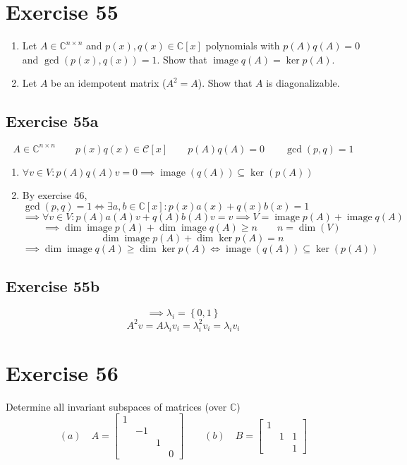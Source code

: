 \documentclass[a4paper]{article}
\theoremstyle{definition}
\DeclareMathOperator\image{image}
\newcommand\set[1]{\left\{#1\right\}}
\begin{document}
\section{Exercise 55}
\begin{ex}
  \begin{enumerate}
    \item Let $A \in \mathbb C^{n \times n}$ and $p(x), q(x) \in \mathbb C[x]$ polynomials with $p(A) q(A) = 0$ and $\operatorname{gcd}(p(x), q(x)) = 1$. Show that $\image{q(A)} = \ker{p(A)}$.
    \item Let $A$ be an idempotent matrix ($A^2 = A$). Show that $A$ is diagonalizable.
  \end{enumerate}
\end{ex}

\subsection{Exercise 55a}

\[ A \in \mathbb C^{n \times n} \qquad p(x) q(x) \in \mathcal C[x] \qquad p(A) q(A) = 0 \qquad \operatorname{gcd}(p,q) = 1 \]
\begin{enumerate}
  \item $\forall v \in V: p(A) q(A) v = 0 \implies \image(q(A)) \subseteq \ker(p(A))$
  \item By exercise 46, $\operatorname{gcd}(p,q) = 1 \iff \exists a, b \in \mathbb C[x]: p(x) a(x) + q(x) b(x) = 1$
    \[ \implies \forall v \in V: p(A) a(A) v + q(A) b(A) v = v \implies V = \image{p(A)} + \image{q(A)} \]
    \[ \implies \dim\image{p(A)} + \dim\image{q(A)} \geq n \qquad n = \dim(V) \]
    \[ \dim{\image{p(A)}} + \dim{\ker{p(A)}} = n \]
    \[ \implies \dim\image{q(A)} \geq \dim\ker{p(A)} \iff \image(q(A)) \subseteq \ker(p(A)) \]
\end{enumerate}

\subsection{Exercise 55b}
\[ \implies \lambda_i = \set{0, 1} \]
\[ A^2 v = A \lambda_i v_i = \lambda_i^2 v_i = \lambda_i v_i \]

\section{Exercise 56}
\begin{ex}
  Determine all invariant subspaces of matrices (over $\mathbb C$)
  \[
    (a) \quad A = \begin{bmatrix} 1 & & & \\ & -1 & & \\ & & 1 & \\ & & & 0 \end{bmatrix} \qquad
    (b) \quad B = \begin{bmatrix} 1 & & \\ & 1 & 1 \\ & & 1 \end{bmatrix}
  \]
\end{ex}
\end{document}
